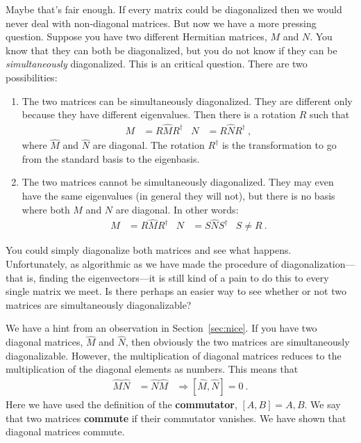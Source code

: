 \documentclass[12pt, oneside]{report}    %
\begin{document}
Maybe that's fair enough. If every matrix could be diagonalized then we would never deal with non-diagonal matrices. But now we have a more pressing question. Suppose you have two different Hermitian matrices, $M$ and $N$. You know that they can both be diagonalized, but you do not know if they can be \emph{simultaneously} diagonalized. This is an critical question. There are two possibilities:
\begin{enumerate}
    \item The two matrices can be simultaneously diagonalized. They are different only because they have different eigenvalues. Then there is a rotation $R$ such that 
    \begin{align}
        M &= R \hat M R^\dag
        &
        N &= R \hat N R^\dag \ ,
    \end{align}
    where $\hat M$ and $\hat N$ are diagonal. The rotation $R^\dag$ is the transformation to go from the standard basis to the eigenbasis.
    \item The two matrices cannot be simultaneously diagonalized. They may even have the same eigenvalues (in general they will not), but there is no basis where both $M$ and $N$ are diagonal. In other words:
     \begin{align}
        M &= R \hat M R^\dag
        &
        N &= S \hat N S^\dag 
        &
        S\neq R \ .
    \end{align}
\end{enumerate}
You could simply diagonalize both matrices and see what happens. Unfortunately, as algorithmic as we have made the procedure of diagonalization---that is, finding the eigenvectors---it is still kind of a pain to do this to every single matrix we meet. Is there perhaps an easier way to see whether or not two matrices are simultaneously diagonalizable?

\begin{example}
We have a hint from an observation in Section~\ref{sec:nice}. If you have two diagonal matrices, $\hat M$ and $\hat N$, then obviously the two matrices are simultaneously diagonalizable. However, the multiplication of diagonal matrices reduces to the multiplication of the diagonal elements as numbers. This means that
\begin{align}
    \hat M \hat N &= \hat N \hat M
    &\Rightarrow 
    \left[\hat M, \hat N\right] = 0
    \ .
\end{align}
Here we have used the definition of the \textbf{commutator}, $[A,B] = A,B$. We say that two matrices \textbf{commute} if their commutator vanishes. We have shown that diagonal matrices commute.
\end{example}
\end{document}
